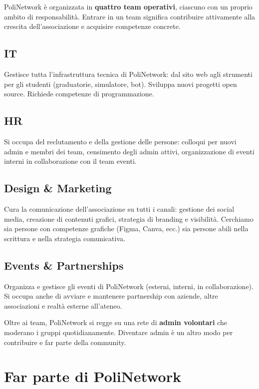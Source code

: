 \documentclass[letter]{polinetwork}
\begin{document}
PoliNetwork è organizzata in \textbf{quattro team operativi},
ciascuno con un proprio ambito di responsabilità. Entrare in un
team significa contribuire attivamente alla crescita
dell'associazione e acquisire competenze concrete.

\subsection{IT}
Gestisce tutta l'infrastruttura tecnica di PoliNetwork: dal
sito web agli strumenti per gli studenti (graduatorie, simulatore,
bot). Sviluppa nuovi progetti open source. Richiede competenze
di programmazione.

\subsection{HR}
Si occupa del reclutamento e della gestione delle persone:
colloqui per nuovi admin e membri dei team, censimento degli
admin attivi, organizzazione di eventi interni in collaborazione
con il team eventi.

\subsection{Design \& Marketing}
Cura la comunicazione dell'associazione su tutti i canali: gestione
dei social media, creazione di contenuti grafici, strategia di
branding e visibilità. Cerchiamo sia persone con competenze
grafiche (Figma, Canva, ecc.) sia persone abili nella scrittura
e nella strategia comunicativa.

\subsection{Events \& Partnerships}
Organizza e gestisce gli eventi di PoliNetwork (esterni, interni,
in collaborazione). Si occupa anche di avviare e mantenere
partnership con aziende, altre associazioni e realtà esterne
all'ateneo.

\vspace{1em}

Oltre ai team, PoliNetwork si regge su una rete di
\textbf{admin volontari} che moderano i gruppi quotidianamente.
Diventare admin è un altro modo per contribuire e far parte della
community.

\section{Far parte di PoliNetwork}
\end{document}
